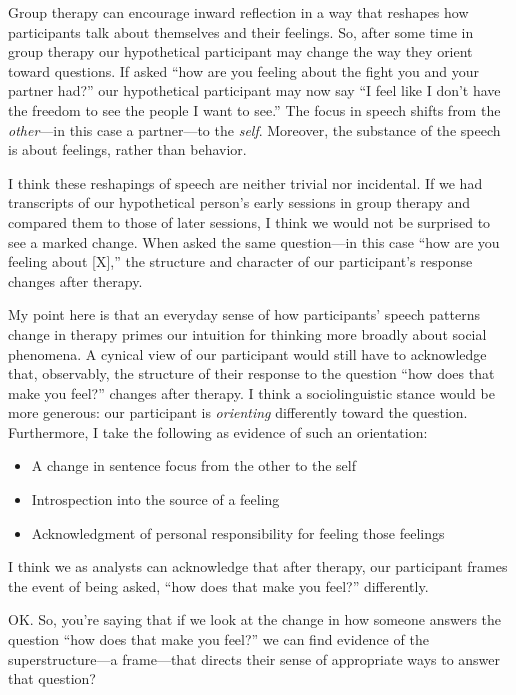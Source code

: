 Group therapy can encourage inward reflection in a way that reshapes how
participants talk about themselves and their feelings. So, after some
time in group therapy our hypothetical participant may change the way
they orient toward questions. If asked ``how are you feeling about the
fight you and your partner had?'' our hypothetical participant may now
say ``I feel like I don't have the freedom to see the people I want to
see.'' The focus in speech shifts from the \emph{other}---in this case a
partner---to the \emph{self}. Moreover, the substance of the speech is
about feelings, rather than behavior.

I think these reshapings of speech are neither trivial nor incidental.
If we had transcripts of our hypothetical person's early sessions in
group therapy and compared them to those of later sessions, I think we
would not be surprised to see a marked change. When asked the same
question---in this case ``how are you feeling about {[}X{]},'' the
structure and character of our participant's response changes after
therapy.

My point here is that an everyday sense of how participants' speech
patterns change in therapy primes our intuition for thinking more
broadly about social phenomena. A cynical view of our participant would
still have to acknowledge that, observably, the structure of their
response to the question ``how does that make you feel?'' changes after
therapy. I think a sociolinguistic stance would be more generous: our
participant is \emph{orienting} differently toward the question.
Furthermore, I take the following as evidence of such an orientation:

\begin{itemize}
\item
  A change in sentence focus from the other to the self
\item
  Introspection into the source of a feeling
\item
  Acknowledgment of personal responsibility for feeling those feelings
\end{itemize}

I think we as analysts can acknowledge that after therapy, our
participant frames the event of being asked, ``how does that make you
feel?'' differently.

OK. So, you're saying that if we look at the change in how someone
answers the question ``how does that make you feel?'' we can find
evidence of the superstructure---a frame---that directs their sense of
appropriate ways to answer that question?

